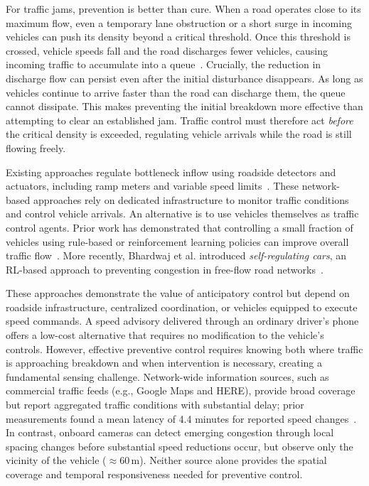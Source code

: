 \documentclass[letterpaper, 10pt, journal, twoside]{IEEEtran}
\begin{document}
For traffic jams, prevention is better than cure. When a road operates close to its maximum flow, even a temporary lane obstruction or a short surge in incoming vehicles can push its density beyond a critical threshold. Once this threshold is crossed, vehicle speeds fall and the road discharges fewer vehicles, causing incoming traffic to accumulate into a queue~\cite{bhardwaj2023understanding}. Crucially, the reduction in discharge flow can persist even after the initial disturbance disappears. As long as vehicles continue to arrive faster than the road can discharge them, the queue cannot dissipate. This makes preventing the initial breakdown more effective than attempting to clear an established jam. Traffic control must therefore act \emph{before} the critical density is exceeded, regulating vehicle arrivals while the road is still flowing freely.

Existing approaches regulate bottleneck inflow using roadside detectors and actuators, including ramp meters and variable speed limits~\cite{papageorgiou2002freeway,hegyi2008specialist}. These network-based approaches rely on dedicated infrastructure to monitor traffic conditions and control vehicle arrivals. An alternative is to use vehicles themselves as traffic control agents. Prior work has demonstrated that controlling a small fraction of vehicles using rule-based or reinforcement learning policies can improve overall traffic flow~\cite{stern2018dissipation,wu2017flow,vinitsky2018benchmarks,kreidieh2018dissipating,lee2024traffic}. More recently, Bhardwaj et al. introduced \emph{self-regulating cars}, an RL-based approach to preventing congestion in free-flow road networks~\cite{self_regulating_cars}.

These approaches demonstrate the value of anticipatory control but depend on roadside infrastructure, centralized coordination, or vehicles equipped to execute speed commands. A speed advisory delivered through an ordinary driver's phone offers a low-cost alternative that requires no modification to the vehicle's controls. However, effective preventive control requires knowing both where traffic is approaching breakdown and when intervention is necessary, creating a fundamental sensing challenge. Network-wide information sources, such as commercial traffic feeds (e.g., Google Maps and HERE), provide broad coverage but report aggregated traffic conditions with substantial delay; prior measurements found a mean latency of 4.4 minutes for reported speed changes~\cite{wang2018latency}. In contrast, onboard cameras can detect emerging congestion through local spacing changes before substantial speed reductions occur, but observe only the vicinity of the vehicle ($\approx 60\,\mathrm{m}$). Neither source alone provides the spatial coverage and temporal responsiveness needed for preventive control.
\end{document}
